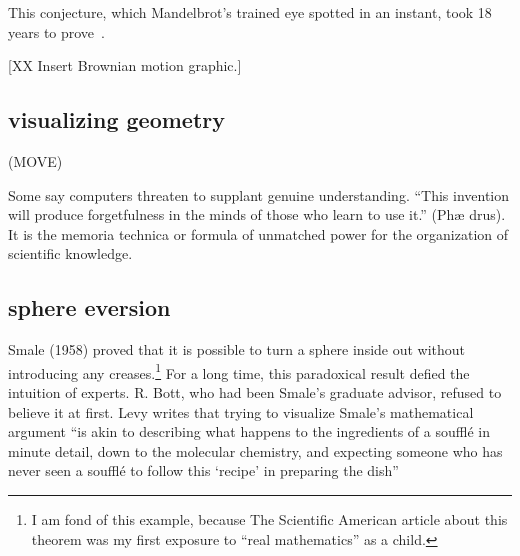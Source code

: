 \documentclass{llncs}
\begin{document}
\bigskip

This conjecture, which  Mandelbrot's trained eye spotted in an instant,
took 18 years to prove~\cite{LSW01}.

[XX Insert Brownian motion graphic.]

%
%




\subsection{visualizing geometry}

(MOVE)

Some say computers threaten to supplant genuine
understanding.  ``This invention will produce
forgetfulness in the minds of those who learn to use it.'' (Ph\ae
drus).  
It is the memoria technica or formula of unmatched power for the
organization of scientific knowledge.


\subsection{sphere eversion}







Smale (1958) proved that it is possible to turn a sphere inside out
without introducing any creases.\footnote{I am fond of this example,
because The Scientific American
  article \cite{Phi66} about this theorem was my first exposure to ``real
  mathematics'' as a child.}  For a long time, this paradoxical result
defied the intuition of experts.  R. Bott, who had been Smale's
graduate advisor, refused to believe it at first.  Levy writes that
trying to visualize Smale's mathematical argument ``is akin to
describing what happens to the ingredients of a souffl\'e in minute
detail, down to the molecular chemistry, and expecting someone who has
never seen a souffl\'e to follow this `recipe' in preparing the
dish''~\cite{Le95}
\end{document}
